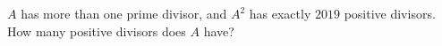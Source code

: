 $A$ has more than one prime divisor, and $A^2$ has exactly $2019$ positive divisors. How many positive divisors does $A$ have?
